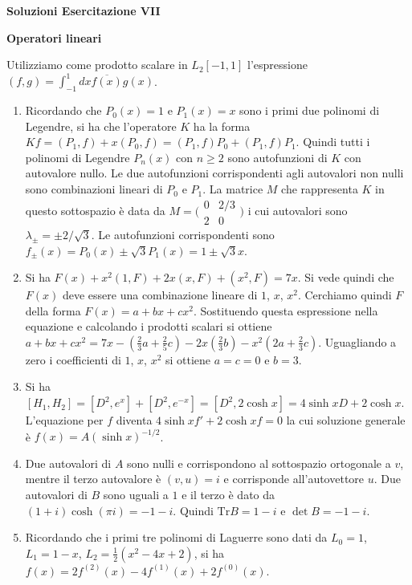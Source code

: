 \documentclass[a4paper,10pt]{article}
\begin{document}
\newpage


\centerline{\LARGE \bf Soluzioni Esercitazione VII}
\vskip10pt

\centerline{\large \bf Operatori lineari}
\vskip10pt
Utilizziamo come prodotto scalare in $L_2[-1,1]$ l'espressione
$(f,g) = \int_{-1}^1 dx \overline{f(x)} g(x)$.

\begin{enumerate}
\item Ricordando
che $P_0(x)=1$ e $P_1(x)=x$ sono i primi due polinomi di Legendre, si ha che
 l'operatore $K$ ha la forma $K f = (P_1,f) + x (P_0,f)=(P_1,f)P_0 +  (P_1,f)P_1$. Quindi
tutti i polinomi di Legendre $P_n(x)$ con $n \geq 2$ sono autofunzioni
di $K$ con autovalore nullo. Le due autofunzioni corrispondenti agli
autovalori non nulli sono combinazioni lineari di $P_0$ e $P_1$.
La matrice $M$ che rappresenta $K$ in questo sottospazio \`e data da
$M=\bigl( \begin{smallmatrix} 0 & 2/3 \\ 2 & 0 \end{smallmatrix} \bigr)$
i cui autovalori sono $\lambda_\pm = \pm 2/\sqrt{3}$.
Le autofunzioni corrispondenti sono $f_\pm(x) = P_0(x) \pm \sqrt{3} P_1(x)
= 1 \pm\sqrt{3} x$. 
\item Si ha $F(x) + x^2 (1,F) + 2x (x,F) + (x^2,F) = 7x$. Si vede quindi
che $F(x)$ deve essere una combinazione lineare di $1$, $x$, $x^2$.
Cerchiamo quindi $F$ della forma $F(x)= a + b x + c x^2$.
Sostituendo questa espressione nella equazione e calcolando i prodotti scalari
si ottiene
$a + bx + c x^2 = 7x - \left(\frac{2}{3} a + \frac{2}{5} c \right)
- 2x \left( \frac{2}{3} b \right) - 
x^2 \left( 2 a + \frac{2}{3} c \right)$.
Uguagliando a zero i coefficienti di $1$, $x$, $x^2$ si ottiene $a=c=0$
e $b=3$.
\item Si ha $[H_1,H_2] = [D^2, e^x] + [D^2, e^{-x}] = 
[D^2, 2\cosh x] = 4 \sinh x D + 2\cosh x$.
L'equazione per $f$ diventa $4 \sinh x f' + 2\cosh x f =0 $ la cui
soluzione generale \`e $f(x) = A (\sinh x)^{-1/2}$.
\item Due autovalori di $A$ sono nulli 
e corrispondono al sottospazio ortogonale
a $v$, mentre il terzo autovalore \`e $(v,u)=i$ e corrisponde all'autovettore
$u$. Due autovalori di $B$ sono uguali a $1$ e il terzo \`e dato da
$(1+i)\cosh(\pi i) = -1-i$. Quindi $\text{Tr}B = 1-i$ e $\det B = -1-i$.
\item Ricordando che i primi tre polinomi di Laguerre sono dati da
$L_0 = 1$, $L_1 = 1-x$, $L_2 = \frac{1}{2} (x^2 -4x+2)$, si ha
$f(x) = 2 f^{(2)}(x) - 4 f^{(1)}(x) + 2 f^{(0)}(x)$.

\end{enumerate}
\end{document}
